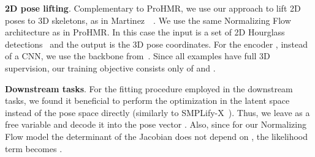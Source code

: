 \noindent
\textbf{2D pose lifting}.
Complementary to ProHMR, we use our approach to lift 2D poses to 3D skeletons, as in Martinez~\etal~\cite{martinez2017simple}. We use the same Normalizing Flow architecture as in ProHMR. In this case the input is a set of 2D Hourglass detections~\cite{newell2016stacked} and the output is the 3D pose coordinates. For the encoder , instead of a CNN, we use the backbone from~\cite{martinez2017simple}. Since all examples have full 3D supervision, our training objective consists only of  and .

\noindent
\textbf{Downstream tasks}.
For the fitting procedure employed in the downstream tasks, we found it beneficial to perform the optimization in the latent space instead of the pose space directly (similarly to SMPLify-X~\cite{pavlakos2019expressive}). Thus, we leave  as a free variable and decode it into the pose vector . Also, since for our Normalizing Flow model the determinant of the Jacobian does not depend on , the likelihood term becomes .